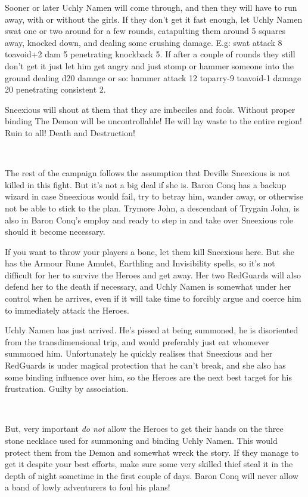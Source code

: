 Sooner or later Uchly Namen will come through, and then they will have to run away, with or without the girls. If they don't get it fast enough, let Uchly Namen swat one or two around for a few rounds, catapulting them around 5 squares away, knocked down, and dealing some crushing damage. E.g: swat attack 8 toavoid+2 dam 5 penetrating knockback 5. If after a couple of rounds they still don't get it just let him get angry and just stomp or hammer someone into the ground dealing d20 damage or so: hammer attack 12 toparry-9 toavoid-1 damage 20 penetrating consistent 2.

Sneexious will shout at them that they are imbeciles and fools. Without proper binding The Demon will be uncontrollable! He will lay waste to the entire region! Ruin to all! Death and Destruction!

\

The rest of the campaign follows the assumption that Deville Sneexious is not killed in this fight. But it's not a big deal if she is. Baron Conq has a backup wizard in case Sneexious would fail, try to betray him, wander away, or otherwise not be able to stick to the plan. Trymore John, a descendant of Trygain John, is also in Baron Conq's employ and ready to step in and take over Sneexious role should it become necessary.

If you want to throw your players a bone, let them kill Sneexious here. But she has the Armour Rune Amulet, Earthling and Invisibility spells, so it's not difficult for her to survive the Heroes and get away. Her two RedGuards will also defend her to the death if necessary, and Uchly Namen is somewhat under her control when he arrives, even if it will take time to forcibly argue and coerce him to immediately attack the Heroes.

Uchly Namen has just arrived. He's pissed at being summoned, he is disoriented from the transdimensional trip, and would preferably just eat whomever summoned him. Unfortunately he quickly realises that Sneexious and her RedGuards is under magical protection that he can't break, and she also has some binding influence over him, so the Heroes are the next best target for his frustration. Guilty by association.

\

But, very important \emph{do not} allow the Heroes to get their hands on the three stone necklace used for summoning and binding Uchly Namen. This would protect them from the Demon and somewhat wreck the story. If they manage to get it despite your best efforts, make sure some very skilled thief steal it in the depth of night sometime in the first couple of days. Baron Conq will never allow a band of lowly adventurers to foul his plans!




